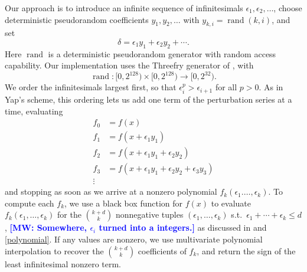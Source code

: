 \documentclass[11pt]{article}
\newcommand{\rand}{\operatorname{rand}}
\newcommand{\MW}[1]{\textcolor{blue}{\bf[MW: #1]}}
\begin{document}
Our approach is to introduce an infinite sequence of infinitesimals $\epsilon_1, \epsilon_2, \ldots$, choose deterministic pseudorandom coefficients $y_1, y_2, \ldots$
with $y_{k,i} = \rand(k,i)$, and set
$$\delta = \epsilon_1 y_1 + \epsilon_2 y_2 + \cdots.$$
Here $\rand$ is a deterministic pseudorandom generator with random access capability.  Our implementation uses the Threefry generator of
\cite{salmon2011random}, with
$$\rand : [0,2^{128}) \times [0,2^{128}) \to [0,2^{32}).$$
We order the infinitesimals largest first, so that $\epsilon_i^p > \epsilon_{i+1}$ for all $p > 0$.  As in Yap's scheme, this ordering lets us add one term of the
perturbation series at a time, evaluating
\begin{align*}
f_0 &= f(x) \\
f_1 &= f(x + \epsilon_1 y_1) \\
f_2 &= f(x + \epsilon_1 y_1 + \epsilon_2 y_2) \\
f_3 &= f(x + \epsilon_1 y_1 + \epsilon_2 y_2 + \epsilon_3 y_3) \\
\vdots
\end{align*}
and stopping as soon as we arrive at a nonzero polynomial $f_k(\epsilon_1. \ldots, \epsilon_k)$.
To compute each $f_k$, we use a black box function for $f(x)$ to evaluate $f_k(\epsilon_1, \ldots, \epsilon_k)$ for the $\binom{k+d}{k}$ nonnegative tuples $(\epsilon_1, \ldots, \epsilon_k)$
s.t.\ $\epsilon_1 + \cdots + \epsilon_k \le d$, \MW{Somewhere, $\epsilon_{i}$ turned into a integers.} as discussed in \cite{neidinger2009multivariable} and \autoref{polynomial}.  If any values are nonzero, we use multivariate
polynomial interpolation to recover the $\binom{k+d}{k}$ coefficients of $f_k$, and return the sign of the least infinitesimal nonzero term.
\end{document}
